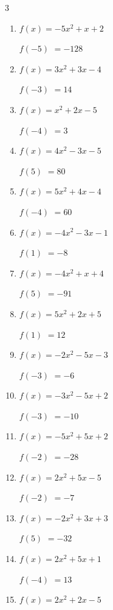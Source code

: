 \begin{multicols}{3}
\begin{enumerate}
$f(-2)$
        $= -19$

\columnbreak %

  \item $f(x)=-5x^{2}+x+2$

$f(-5)$
        $= -128$

  \item $f(x)=3x^{2}+3x-4$

$f(-3)$
        $= 14$

  \item $f(x)=x^{2}+2x-5$

$f(-4)$
        $= 3$

  \item $f(x)=4x^{2}-3x-5$

$f(5)$
        $= 80$

  \item $f(x)=5x^{2}+4x-4$

$f(-4)$
        $= 60$

  \item $f(x)=-4x^{2}-3x-1$

$f(1)$
        $= -8$

  \item $f(x)=-4x^{2}+x+4$

$f(5)$
        $= -91$

  \item $f(x)=5x^{2}+2x+5$

$f(1)$
        $= 12$

  \item $f(x)=-2x^{2}-5x-3$

$f(-3)$
        $= -6$

  \item $f(x)=-3x^{2}-5x+2$

$f(-3)$
        $= -10$

  \item $f(x)=-5x^{2}+5x+2$

$f(-2)$
        $= -28$

  \item $f(x)=2x^{2}+5x-5$

$f(-2)$
        $= -7$

  \item $f(x)=-2x^{2}+3x+3$

$f(5)$
        $= -32$

  \item $f(x)=2x^{2}+5x+1$

$f(-4)$
        $= 13$

  \item $f(x)=2x^{2}+2x-5$


\end{enumerate}
\end{multicols}
